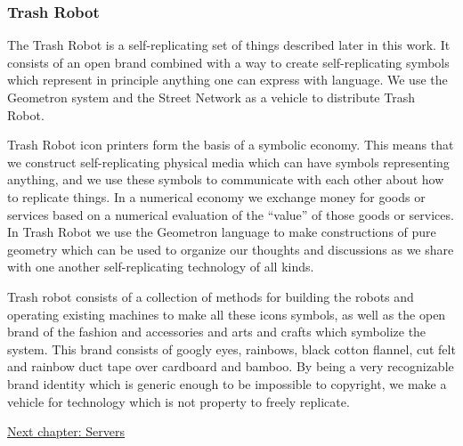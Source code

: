 \hypertarget{trash-robot}{%
\subsubsection{Trash Robot}\label{trash-robot}}

The Trash Robot is a self-replicating set of things described later in
this work. It consists of an open brand combined with a way to create
self-replicating symbols which represent in principle anything one can
express with language. We use the Geometron system and the Street
Network as a vehicle to distribute Trash Robot.

Trash Robot icon printers form the basis of a symbolic economy. This
means that we construct self-replicating physical media which can have
symbols representing anything, and we use these symbols to communicate
with each other about how to replicate things. In a numerical economy we
exchange money for goods or services based on a numerical evaluation of
the ``value'' of those goods or services. In Trash Robot we use the
Geometron language to make constructions of pure geometry which can be
used to organize our thoughts and discussions as we share with one
another self-replicating technology of all kinds.

Trash robot consists of a collection of methods for building the robots
and operating existing machines to make all these icons symbols, as well
as the open brand of the fashion and accessories and arts and crafts
which symbolize the system. This brand consists of googly eyes,
rainbows, black cotton flannel, cut felt and rainbow duct tape over
cardboard and bamboo. By being a very recognizable brand identity which
is generic enough to be impossible to copyright, we make a vehicle for
technology which is not property to freely replicate.

\href{scrolls/servers.md}{Next chapter: Servers}
